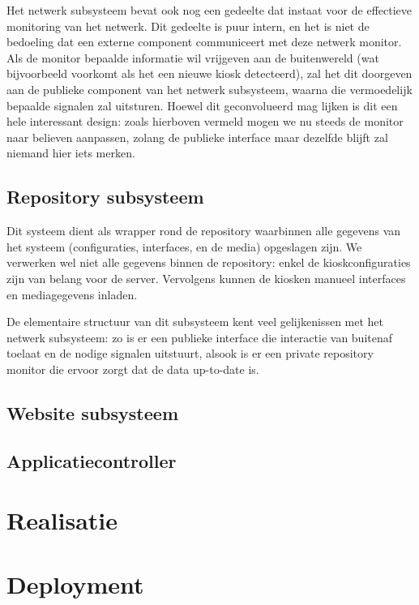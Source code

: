 \documentclass[verslag.tex]{subfiles}
\begin{document}
Het netwerk subsysteem bevat ook nog een gedeelte dat instaat voor de effectieve monitoring van het netwerk. Dit gedeelte is puur intern, en het is niet de bedoeling dat een externe component communiceert met deze netwerk monitor. Als de monitor bepaalde informatie wil vrijgeven aan de buitenwereld (wat bijvoorbeeld voorkomt als het een nieuwe kiosk detecteerd), zal het dit doorgeven aan de publieke component van het netwerk subsysteem, waarna die vermoedelijk bepaalde signalen zal uitsturen. Hoewel dit geconvolueerd mag lijken is dit een hele interessant design: zoals hierboven vermeld mogen we nu steeds de monitor naar believen aanpassen, zolang de publieke interface maar dezelfde blijft zal niemand hier iets merken.



\section{Repository subsysteem}

Dit systeem dient als wrapper rond de repository waarbinnen alle gegevens van het systeem (configuraties, interfaces, en de media) opgeslagen zijn. We verwerken wel niet alle gegevens binnen de repository: enkel de kioskconfiguraties zijn van belang voor de server. Vervolgens kunnen de kiosken manueel interfaces en mediagegevens inladen.

De elementaire structuur van dit subsysteem kent veel gelijkenissen met het netwerk subsysteem: zo is er een publieke interface die interactie van buitenaf toelaat en de nodige signalen uitstuurt, alsook is er een private repository monitor die ervoor zorgt dat de data up-to-date is.


\section{Website subsysteem}

\section{Applicatiecontroller}


\chapter{Realisatie}


\chapter{Deployment}

\end{document}
